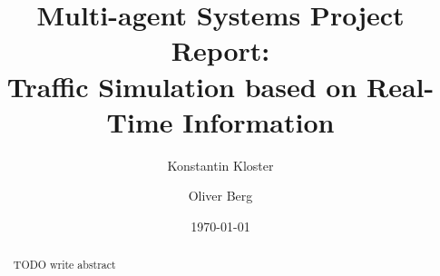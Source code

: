 \documentclass[10pt, oneside]{article}
\title{Multi-agent Systems Project Report: \\
    Traffic Simulation based on Real-Time Information}
\author[]{Konstantin Kloster}
\author[]{Oliver Berg}
\affil[1]{Technical University Kaiserslautern}
\date{\today}
\begin{document}
\maketitle



\begin{abstract}
    TODO write abstract
\end{abstract}

\tableofcontents

\newpage
\newpage
\newpage
\newpage
\newpage
\newpage



\newpage



\end{document}
